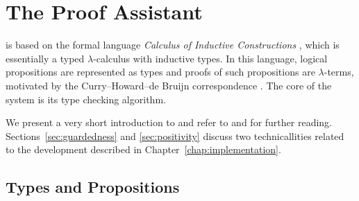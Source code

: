 \chapter{The \texorpdfstring{\Coq}{Coq} Proof Assistant}\label{chap:coq}

\Coq \citep{coq-refman-09} is based on the formal
language \emph{Calculus of Inductive Constructions}
\citep{coquand-huet-88,mohring-93}, which is essentially a typed
$\lambda$-calculus with inductive types. In this language, logical
propositions are represented as types and proofs of such propositions
are $\lambda$-terms, motivated by the Curry--Howard--de Bruijn
correspondence \citep{girard-89}. The core of the \Coq system is its type
checking algorithm.

We present a very short introduction to \Coq and refer to
\citet{bertot-casteran-04} and \citet{chlipala-09} for further
reading. Sections~\ref{sec:guardedness} and \ref{sec:positivity} discuss two
technicallities related to the \Coq development described in
Chapter~\ref{chap:implementation}.


\section{Types and Propositions}

